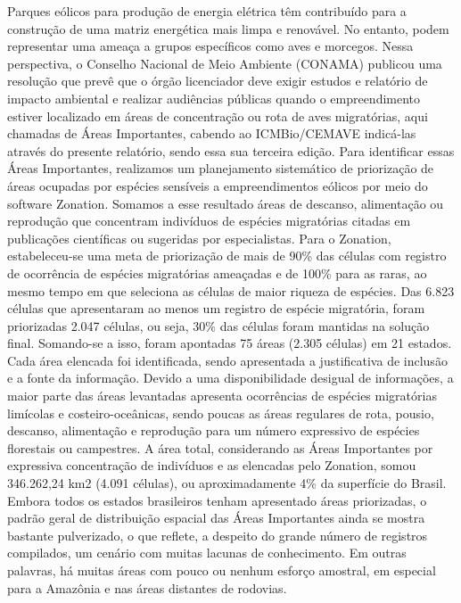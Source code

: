 \documentclass[
]{scrbook}
\begin{document}
Parques eólicos para produção de energia elétrica têm contribuído para a construção de uma matriz energética mais limpa e renovável. No entanto, podem representar uma ameaça a grupos específicos como aves e morcegos. Nessa perspectiva, o Conselho Nacional de Meio Ambiente (CONAMA) publicou uma resolução que prevê que o órgão licenciador deve exigir estudos e relatório de impacto ambiental e realizar audiências públicas quando o empreendimento estiver localizado em áreas de concentração ou rota de aves migratórias, aqui chamadas de Áreas Importantes, cabendo ao ICMBio/CEMAVE indicá-las através do presente relatório, sendo essa sua terceira edição. Para identificar essas Áreas Importantes, realizamos um planejamento sistemático de priorização de áreas ocupadas por espécies sensíveis a empreendimentos eólicos por meio do software Zonation. Somamos a esse resultado áreas de descanso, alimentação ou reprodução que concentram indivíduos de espécies migratórias citadas em publicações científicas ou sugeridas por especialistas. Para o Zonation, estabeleceu-se uma meta de priorização de mais de 90\% das células com registro de ocorrência de espécies migratórias ameaçadas e de 100\% para as raras, ao mesmo tempo em que seleciona as células de maior riqueza de espécies. Das 6.823 células que apresentaram ao menos um registro de espécie migratória, foram priorizadas 2.047 células, ou seja, 30\% das células foram mantidas na solução final. Somando-se a isso, foram apontadas 75 áreas (2.305 células) em 21 estados. Cada área elencada foi identificada, sendo apresentada a justificativa de inclusão e a fonte da informação. Devido a uma disponibilidade desigual de informações, a maior parte das áreas levantadas apresenta ocorrências de espécies migratórias limícolas e costeiro-oceânicas, sendo poucas as áreas regulares de rota, pousio, descanso, alimentação e reprodução para um número expressivo de espécies florestais ou campestres. A área total, considerando as Áreas Importantes por expressiva concentração de indivíduos e as elencadas pelo Zonation, somou 346.262,24 km2 (4.091 células), ou aproximadamente 4\% da superfície do Brasil. Embora todos os estados brasileiros tenham apresentado áreas priorizadas, o padrão geral de distribuição espacial das Áreas Importantes ainda se mostra bastante pulverizado, o que reflete, a despeito do grande número de registros compilados, um cenário com muitas lacunas de conhecimento. Em outras palavras, há muitas áreas com pouco ou nenhum esforço amostral, em especial para a Amazônia e nas áreas distantes de rodovias.
\end{document}
